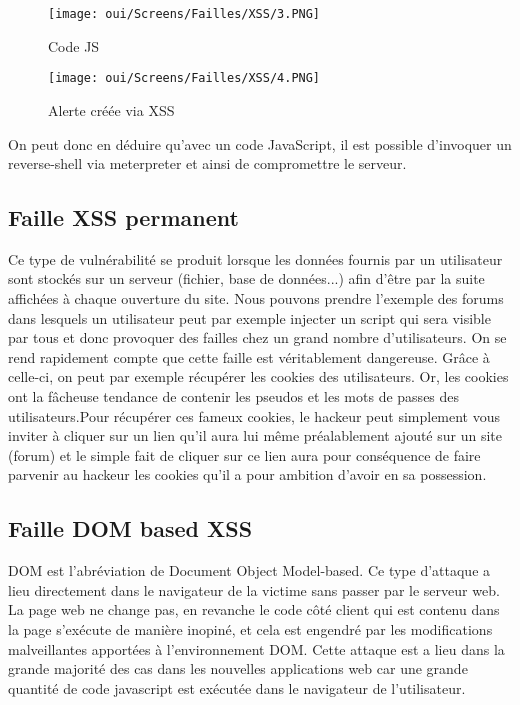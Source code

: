 \begin{figure}[htp!]
  \centering
  \setlength\figureheight{7cm}
  \setlength\figurewidth{9cm}
  \texttt{[image: oui/Screens/Failles/XSS/3.PNG]}
  \caption{Code JS}
  \label{fig:courbe-tikz}
\end{figure}

\begin{figure}[htp!]
  \centering
  \setlength\figureheight{7cm}
  \setlength\figurewidth{9cm}
  \texttt{[image: oui/Screens/Failles/XSS/4.PNG]}
  \caption{Alerte créée via XSS}
  \label{fig:courbe-tikz}
\end{figure}

\newpage
On peut donc en déduire qu'avec un code JavaScript, il est possible d'invoquer un reverse-shell via meterpreter et ainsi de compromettre le serveur.


\subsection{Faille XSS permanent}

Ce type de vulnérabilité se produit lorsque les données fournis par un utilisateur sont stockés sur un serveur (fichier, base de données...) afin d’être par la suite affichées à chaque ouverture du site. Nous pouvons prendre l’exemple des forums dans lesquels un utilisateur peut par exemple injecter un script qui sera visible par tous et donc provoquer des failles chez un grand nombre d’utilisateurs. On se rend rapidement compte que cette faille est véritablement dangereuse. Grâce à celle-ci, on peut par exemple récupérer les cookies des utilisateurs. Or, les cookies ont la fâcheuse tendance de contenir les pseudos et les mots de passes des utilisateurs.Pour récupérer ces fameux cookies, le hackeur peut simplement vous inviter à cliquer sur un lien qu’il aura lui même préalablement ajouté sur un site (forum) et le simple fait de cliquer sur ce lien aura pour conséquence de faire parvenir au hackeur les cookies qu’il a pour ambition d’avoir en sa possession.

\subsection{Faille DOM based XSS}

DOM est l’abréviation de Document Object Model-based. 
Ce type d’attaque a lieu directement dans le navigateur de la victime sans passer par le serveur web. La page web ne change pas, en revanche le code côté client qui est contenu dans la page s'exécute de manière inopiné, et cela est engendré par les modifications malveillantes apportées à l’environnement DOM.
Cette attaque est a lieu dans la grande majorité des cas dans les nouvelles applications web car une grande quantité de code javascript est exécutée dans le navigateur de l’utilisateur.

